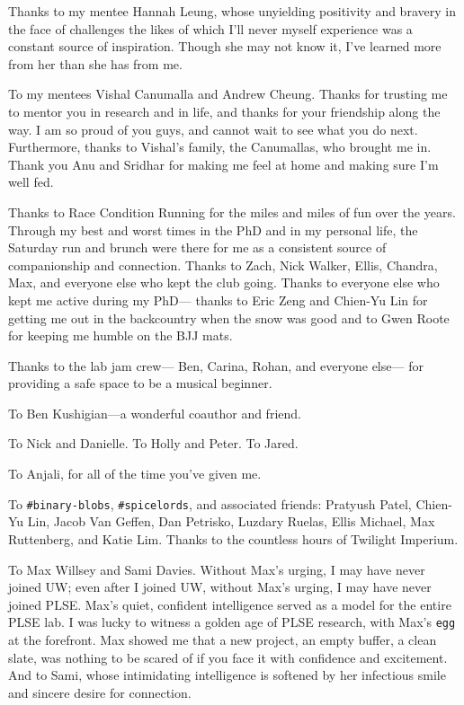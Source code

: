 Thanks to my mentee Hannah Leung,
  whose unyielding positivity
  and bravery
  in the face of challenges
  the likes of which I'll never 
  myself experience
  was a constant source of inspiration.
Though she may not know it,
  I've learned more from her
  than she has from me.
  

To my mentees
  Vishal Canumalla
  and Andrew Cheung.
Thanks for trusting me
  to mentor you in research and in life,
  and thanks for your friendship
  along the way.
I am so proud of you guys,
  and cannot wait to see what you do next.
Furthermore, thanks to Vishal's family,
  the Canumallas,
  who brought me in.
Thank you Anu and Sridhar
  for making me feel at home
  and making sure I'm well fed.

Thanks to Race Condition Running
  for the miles and miles of fun
  over the years.
Through my best and worst times
  in the PhD and in my personal life,
  the Saturday run and brunch
  were there for me
  as a consistent source of companionship
  and connection.
Thanks to Zach, Nick Walker, Ellis,
  Chandra, Max,
  and everyone else who
  kept the club going.
Thanks to everyone else who kept me active
  during my PhD---%
  thanks to Eric Zeng and Chien-Yu Lin
  for getting me out in the backcountry
  when the snow was good
  and to Gwen Roote for keeping me humble
  on the BJJ mats.
  
Thanks to the lab jam crew---%
  Ben, Carina, Rohan, and everyone else---%
  for providing a safe space
  to be a musical beginner.



To Ben Kushigian---a wonderful coauthor and friend.
  
To Nick and Danielle.
To Holly and Peter.
To Jared.

To Anjali, for all of the time you've given me.

To \texttt{\#binary-blobs}, \texttt{\#spicelords}, and associated friends:
  Pratyush Patel, Chien-Yu Lin,
  Jacob Van Geffen,
  Dan Petrisko, 
  Luzdary Ruelas,
  Ellis Michael,
  Max Ruttenberg,
  and Katie Lim.
Thanks to the countless hours
  of Twilight Imperium.


To Max Willsey and Sami Davies.
Without Max's urging,
  I may have never joined UW;
  even after I joined UW, without Max's urging,
  I may have never joined PLSE.
Max's quiet, confident intelligence
  served as a model for the entire PLSE lab.
I was lucky to witness
  a golden age of PLSE research,
  with Max's \texttt{egg} at the forefront.
Max showed me that a new project,
  an empty buffer,
  a clean slate,
  was nothing to be scared of
  if you face it with confidence and excitement.
And to Sami,
  whose intimidating intelligence
  is softened by her infectious smile
  and sincere desire for connection.


